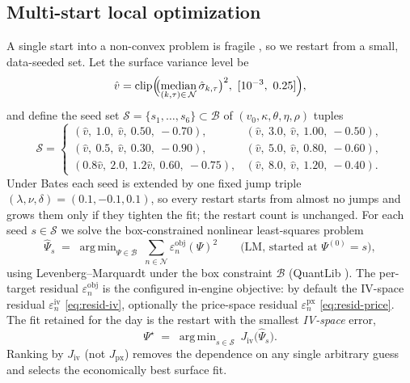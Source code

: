 \documentclass[a4paper, 11pt, reqno]{amsart}
\DeclareMathOperator*{\argmin}{arg\,min}
\DeclareMathOperator{\med}{median}
\DeclareMathOperator{\clip}{clip}
\begin{document}
		\subsection{Multi-start local optimization}\label{sec:multistart}
			A single start into a non-convex problem is fragile \parencite{mikhailov2003}, so we restart from a small,
			data-seeded set. Let the surface variance level be
			\begin{equation}\label{eq:varproxy}
				\hat v = \clip\Bigl( \!\! \bigl(\med_{(k,\tau) \in \, \mathcal{N}} \hat\sigma_{k,\tau}\bigr)^2,\ [10^{-3},\ 0.25] \Bigr),
			\end{equation}
			and define the seed set $\mathcal{S}=\{s_1,\dots,s_6\}\subset\mathcal{B}$ of
			$(v_0,\kappa,\theta,\eta,\rho)$ tuples
			\begin{equation}\label{eq:seeds}
				\mathcal{S} =
				\begin{cases}
					(\hat v,\ 1.0,\ \hat v,\ 0.50,\ -0.70), &
					(\hat v,\ 3.0,\ \hat v,\ 1.00,\ -0.50), \\
					(\hat v,\ 0.5,\ \hat v,\ 0.30,\ -0.90), &
					(\hat v,\ 5.0,\ \hat v,\ 0.80,\ -0.60), \\
					(0.8\hat v,\ 2.0,\ 1.2\hat v,\ 0.60,\ -0.75), &
					(\hat v,\ 8.0,\ \hat v,\ 1.20,\ -0.40).
				\end{cases}
			\end{equation}
			Under Bates each seed is extended by one fixed jump triple
			$(\lambda,\nu,\delta)=(0.1,-0.1,0.1)$, so every restart starts from
			almost no jumps and grows them only if they tighten the fit; the restart count is unchanged.
			For each seed $s\in\mathcal{S}$ we solve the box-constrained nonlinear least-squares problem
			\begin{equation}\label{eq:localproblem}
				\widehat\Psi_s \;=\; \argmin_{\Psi \in \mathcal{B}}\ \sum_{n\in\mathcal{N}} \varepsilon^{\mathrm{obj}}_n(\Psi)^2
				\qquad \text{(LM, started at } \Psi^{(0)}=s\text{)},
			\end{equation}
			using Levenberg--Marquardt under the box constraint $\mathcal{B}$ (QuantLib \texttt{}). 
			The per-target residual $\varepsilon^{\mathrm{obj}}_n$ is the configured in-engine objective: 
			by default the IV-space residual $\varepsilon^{\mathrm{iv}}_n$ \eqref{eq:resid-iv}, optionally 
			the price-space residual $\varepsilon^{\mathrm{px}}_n$ \eqref{eq:resid-price}. The fit retained 
			for the day is the restart with the smallest \emph{IV-space} error,
			\begin{equation}\label{eq:select}
				\Psi^\star \;=\; \argmin_{s\in\mathcal{S}}\ J_{\mathrm{iv}}\!\bigl(\widehat\Psi_s\bigr).
			\end{equation}
			Ranking by $J_{\mathrm{iv}}$ (not $J_{\mathrm{px}}$) removes the dependence on any single
			arbitrary guess and selects the economically best surface fit.
			
\end{document}

